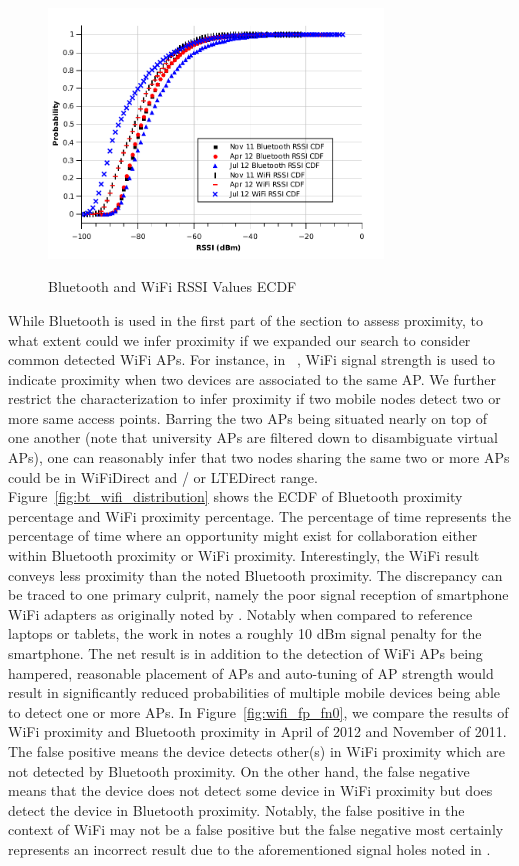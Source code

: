 \begin{figure}[tbp]
\centering 
{\includegraphics[width=3.5in]{graphs/rssi.pdf}}
\caption{Bluetooth and WiFi RSSI Values ECDF} 
\label{fig:rssi}
\end{figure} 

While Bluetooth is used in the first part of the section to assess proximity, to what extent could we infer proximity if we expanded our search to consider common detected WiFi APs.  For instance, in ~\cite{mcnett2005access}, WiFi signal strength is used to indicate proximity when two devices are associated to the same AP.  We further restrict the characterization to infer proximity if two mobile nodes detect two or more same access points.  Barring the two APs being situated nearly on top of one another (note that university APs are filtered down to disambiguate virtual APs), one can reasonably infer that two nodes sharing the same two or more APs could be in WiFiDirect and / or LTEDirect range. Figure~\ref{fig:bt_wifi_distribution} shows the ECDF of Bluetooth proximity percentage and WiFi proximity percentage. The percentage of time represents the percentage of time where an opportunity might exist for collaboration either within Bluetooth proximity or WiFi proximity. Interestingly, the WiFi result conveys less proximity than the noted Bluetooth proximity.  The discrepancy can be traced to one primary culprit, namely the poor signal reception of smartphone WiFi adapters as originally noted by \cite{liu:CellNet12}.  Notably when compared to reference laptops or tablets, the work in \cite{liu:CellNet12} notes a roughly 10 dBm signal penalty for the smartphone.  The net result is in addition to the detection of WiFi APs being hampered, reasonable placement of APs and auto-tuning of AP strength would result in significantly reduced probabilities of multiple mobile devices being able to detect one or more APs. In Figure~\ref{fig:wifi_fp_fn0}, we compare the results of WiFi proximity and Bluetooth proximity in April of 2012 and November of 2011. The false positive means the device detects other(s) in WiFi proximity which are not detected by Bluetooth proximity. On the other hand, the false negative means that the device does not detect some device in WiFi proximity but does detect the device in Bluetooth proximity. Notably, the false positive in the context of WiFi may not be a false positive but the false negative most certainly represents an incorrect result due to the aforementioned signal holes noted in \cite{liu:CellNet12}.  

